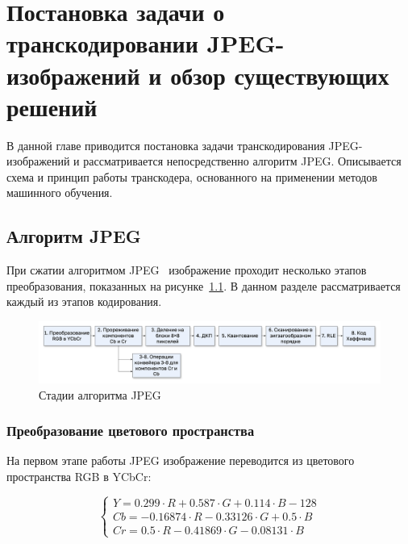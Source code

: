 \documentclass[times,specification,annotation]{itmo-student-thesis}
\begin{document}
\chapter{Постановка задачи о транскодировании JPEG-изображений и обзор существующих решений}\label{chapter:theory}

В данной главе приводится постановка задачи транскодирования JPEG-изображений и рассматривается непосредственно алгоритм JPEG. Описывается схема и принцип работы транскодера, основанного на применении методов машинного обучения.

\startrelatedwork

\section{Алгоритм JPEG}\label{sec:jpeg}

При сжатии алгоритмом JPEG~\cite{jpeg-overview} изображение проходит несколько этапов преобразования, показанных на рисунке~\ref{image:jpeg-overview}. В данном разделе рассматривается каждый из этапов кодирования.

\begin{figure}[!h]
    \centering
    \includegraphics[width=\textwidth]{./images/jpeg-overview.png}
    \caption{Стадии алгоритма JPEG}
    \label{image:jpeg-overview}
\end{figure}

\subsection{Преобразование цветового пространства}\label{subsec:color-space-conversion}

На первом этапе работы JPEG изображение переводится из цветового пространства RGB в YCbCr:\par

\begin{equation*}
    \begin{cases}
        Y = 0.299 \cdot R + 0.587 \cdot G + 0.114 \cdot B - 128 \\
        Cb = -0.16874 \cdot R - 0.33126 \cdot G + 0.5 \cdot B   \\
        Cr = 0.5 \cdot R - 0.41869 \cdot G - 0.08131 \cdot B
    \end{cases}
\end{equation*}
\end{document}

